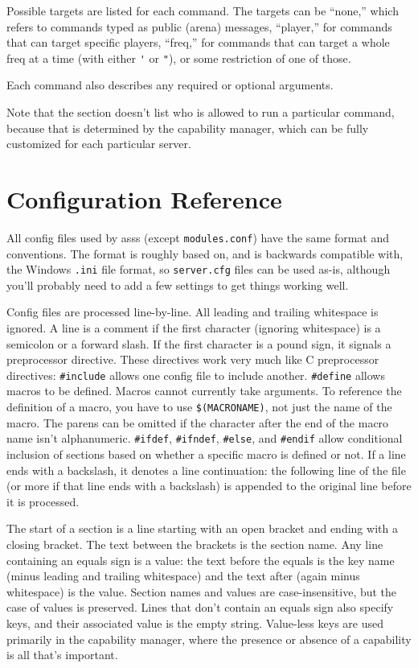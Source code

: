 \documentclass{article}
\newcommand{\asss}{asss}
\begin{document}
Possible targets are listed for each command. The targets can be
``none,'' which refers to commands typed as public (arena) messages,
``player,'' for commands that can target specific players, ``freq,'' for
commands that can target a whole freq at a time (with either \verb/'/ or
\verb/"/), or some restriction of one of those.

Each command also describes any required or optional arguments.

Note that the section doesn't list who is allowed to run a particular
command, because that is determined by the capability manager, which can
be fully customized for each particular server.




\section{Configuration Reference}

All config files used by \asss{} (except \verb/modules.conf/) have the
same format and conventions. The format is roughly based on, and is
backwards compatible with, the Windows \verb/.ini/ file format, so
\verb/server.cfg/ files can be used as-is, although you'll probably need
to add a few settings to get things working well.

Config files are processed line-by-line. All leading and trailing
whitespace is ignored. A line is a comment if the first character
(ignoring whitespace) is a semicolon or a forward slash. If the first
character is a pound sign, it signals a preprocessor directive. These
directives work very much like C preprocessor directives:
\verb/#include/ allows one config file to include another.
\verb/#define/ allows macros to be defined. Macros cannot currently take
arguments. To reference the definition of a macro, you have to use
\verb/$(MACRONAME)/, not just the name of the macro. The parens can be
omitted if the character after the end of the macro name isn't
alphanumeric. \verb/#ifdef/, \verb/#ifndef/, \verb/#else/, and
\verb/#endif/ allow conditional inclusion of sections based on whether a
specific macro is defined or not. If a line ends with a backslash, it
denotes a line continuation: the following line of the file (or more if
that line ends with a backslash) is appended to the original line before
it is processed.

The start of a section is a line starting with an open bracket and
ending with a closing bracket. The text between the brackets is the
section name. Any line containing an equals sign is a value: the text
before the equals is the key name (minus leading and trailing
whitespace) and the text after (again minus whitespace) is the value.
Section names and values are case-insensitive, but the case of values is
preserved. Lines that don't contain an equals sign also specify keys,
and their associated value is the empty string. Value-less keys are used
primarily in the capability manager, where the presence or absence of a
capability is all that's important.
\end{document}
